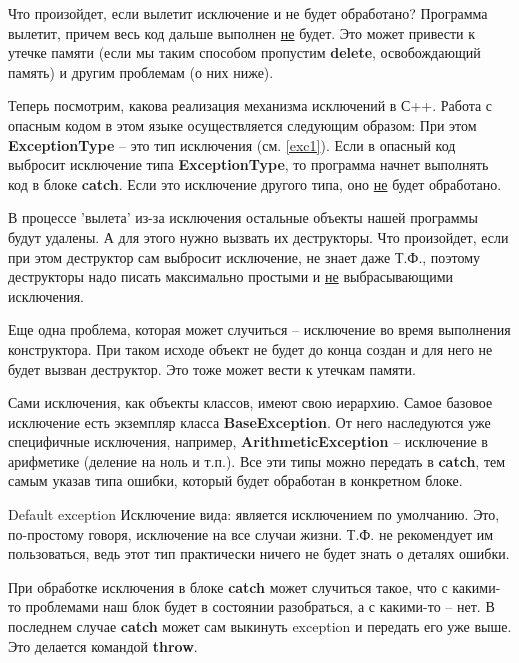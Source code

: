 \begin{lecture}[\lectureSubject]
\begin{lecSection}
	\end{lecSection}
	\begin{lecSection}
		Что произойдет, если вылетит исключение и не будет обработано? Программа вылетит, причем весь код дальше выполнен \underline{не} будет. Это может привести к утечке памяти (если мы таким способом пропустим \textbf{delete}, освобождающий память) и другим проблемам (о них ниже).
	\end{lecSection}
	\begin{lecSection}
		Теперь посмотрим, какова реализация механизма исключений в С++. Работа с опасным кодом в этом языке осуществляется следующим образом:
		При этом \textbf{ExceptionType} -- это тип исключения (см. \ref{exc1}). Если в опасный код выбросит исключение типа \textbf{ExceptionType}, то программа начнет выполнять код в блоке \textbf{catch}. Если это исключение другого типа, оно \underline{не} будет обработано.
	\end{lecSection}
	\begin{lecSection}
		В процессе 'вылета' из-за исключения остальные объекты нашей программы будут удалены. А для этого нужно вызвать их деструкторы. Что произойдет, если при этом деструктор сам выбросит исключение, не знает даже Т.Ф., поэтому деструкторы надо писать максимально простыми и \underline{не} выбрасывающими исключения.
		
		Еще одна проблема, которая может случиться -- исключение во время выполнения конструктора. При таком исходе объект не будет до конца создан и для него не будет вызван деструктор. Это тоже может вести к утечкам памяти.
	\end{lecSection}
	\begin{lecSection}
		Сами исключения, как объекты классов, имеют свою иерархию. Самое базовое исключение есть экземпляр класса \textbf{BaseException}. От него наследуются уже специфичные исключения, например, \textbf{ArithmeticException} -- исключение в арифметике (деление на ноль и т.п.). Все эти типы можно передать в \textbf{catch}, тем самым указав типа ошибки, который будет обработан в конкретном блоке.
		\begin{lecSubsection}{Default exception}
			Исключение вида:
			является исключением по умолчанию. Это, по-простому говоря, исключение на все случаи жизни. Т.Ф. не рекомендует им пользоваться, ведь этот тип практически ничего не будет знать о деталях ошибки.
		\end{lecSubsection}
	\end{lecSection}
	\begin{lecSection}
		При обработке исключения в блоке \textbf{catch} может случиться такое, что с какими-то проблемами наш блок будет в состоянии разобраться, а с какими-то -- нет. В последнем случае \textbf{catch} может сам выкинуть exception и передать его уже выше. Это делается командой \textbf{throw}.
	\end{lecSection}
\end{lecture}
